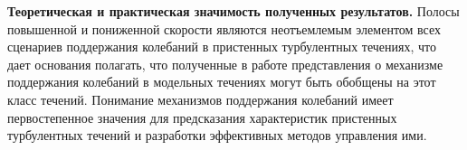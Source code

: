 
{\bf Теоретическая и практическая значимость полученных результатов.}
Полосы повышенной и пониженной скорости являются неотъемлемым элементом всех сценариев поддержания колебаний в пристенных турбулентных течениях, что дает основания полагать, что полученные в работе представления о механизме поддержания колебаний в модельных течениях могут быть обобщены на этот класс течений. Понимание механизмов поддержания колебаний имеет первостепенное значения для предсказания характеристик пристенных турбулентных течений и разработки эффективных методов управления ими.

